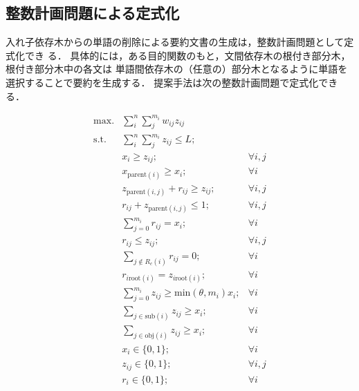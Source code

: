 \documentclass[japanese]{jnlp_1.4}
\begin{document}
\subsection{整数計画問題による定式化}
\label{sec:ilp}

入れ子依存木からの単語の削除による要約文書の生成は，整数計画問題として定式化でき
る．
具体的には，ある目的関数のもと，文間依存木の根付き部分木，根付き部分木中の各文は
単語間依存木の（任意の）部分木となるように単語を選択することで要約を生成する．
提案手法は次の整数計画問題で定式化できる．

\begin{eqnarray}
  \text{max.} & \displaystyle \sum_{i}^n \sum_{j}^{m_i} w_{ij} z_{ij} \nonumber \\
  \text{s.t.}
  & \sum_{i}^n \sum_{j}^{m_i} z_{ij} \leq L                         ;& \label{st_length}\\
  & x_{i}             \geq z_{ij}                    ;& \forall i,j \label{st_word_in}\\
  & x_{\text{parent}(i)}  \geq x_i                ;& \forall i   \label{st_sent_dep}\\
  & z_{\text{parent}(i,j)} + r_{ij} \geq z_{ij}  ;& \forall i,j \label{st_word_dep}\\
  & r_{ij} + z_{\text{parent}(i,j)} \leq 1           ;& \forall i,j \label{st_r_is_top}\\
  & \sum_{j=0}^{m_i} r_{ij}   =  x_i                 ;& \forall i \label{st_one_root}\\
  & r_{ij}            \leq  z_{ij}                   ;& \forall i,j \label{st_r_with_z} \\
  & \sum_{j \notin R_c(i)} r_{ij} = 0                ;& \forall i \label{st_only_rc}\\
  & r_{i \text{root}(i)}     =  z_{i \text{root}(i)} ;& \forall i \label{st_prs_root} \\
  
  & \sum_{j=0}^{m_i} z_{ij} \geq \text{min}(\theta, m_i) x_i ;& \forall i   \label{st_s_has_w}\\
  & \sum_{j \in \text{sub}(i)} z_{ij} \geq  x_i ;& \forall i \label{st_has_sub}\\
  & \sum_{j \in \text{obj}(i)} z_{ij} \geq  x_i ;& \forall i \label{st_has_obj}\\
  & x_i     \in \{0,1\}                         ;& \forall i \\
  & z_{ij}  \in \{0,1\}                         ;& \forall i,j \\
  & r_i     \in \{0,1\}                         ;& \forall i 
\label{fig:model}
\end{eqnarray}
\end{document}
